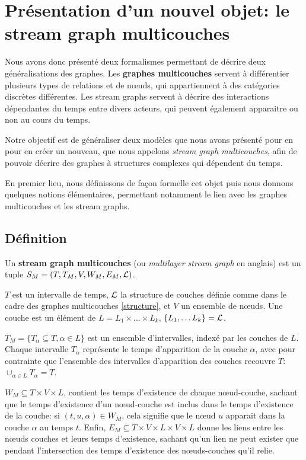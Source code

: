 \documentclass[11pt,a4paper]{article}
\theoremstyle{definition}
\theoremstyle{remark}
\theoremstyle{remark}
\def \stgm {stream graph multicouches}
\def \stgs {stream graphs}
\begin{document}
 
\section{Présentation d'un nouvel objet: le \stgm{}}

    Nous avons donc présenté deux formalismes permettant de décrire deux généralisations des graphes. Les \textbf{graphes multicouches} servent à différentier plusieurs types de relations et de n\oe{}uds, qui appartiennent à des catégories discrètes différentes. Les \stgs{} servent à décrire des interactions dépendantes du temps entre divers acteurs, qui peuvent également apparaitre ou non au cours du temps.
    
    
    Notre objectif est de généraliser deux modèles que nous avons présenté pour en pour en créer un nouveau, que nous appelons \textit{\stgm{}}, afin de pouvoir décrire des graphes à structures complexes qui dépendent du temps.
    
    
    En premier lieu, nous définissons de façon formelle cet objet puis nous donnons quelques notions élémentaires, permettant notamment le lien avec les graphes multicouches et les \stgs{}.


\subsection{Définition}

    Un \textbf{\stgm{}}  (ou \textit{multilayer stream graph} en anglais) est un tuple $S_M = (T,T_M,V,W_M,E_M,{\cal L})$.
    
    $T$ est un intervalle de temps, ${\cal L}$ la structure de couches définie comme dans le cadre des graphes multicouches \cref{structure}, et $V$ un ensemble de n\oe{}uds. Une couche est un élément de $L=L_1\times \dots \times L_k$, $\{L_1,\dots L_k\}={\cal L} $.
    
    $T_M=\{T_{\alpha}\subseteq T, \alpha \in L \}$ est un ensemble d'intervalles, indexé par les couches de $L$. Chaque intervalle $T_{\alpha}$ représente le temps d'apparition de la couche $\alpha$, avec pour contrainte que l'ensemble des intervalles d'apparition des couches recouvre $T$: $\cup_{\alpha \in L} T_{\alpha} = T$. 
    
    $W_M \subseteq T \times V \times L$, contient les temps d'existence de chaque nœud-couche, sachant que le temps d'existence d'un nœud-couche est inclus dans le temps d'existence de la couche: si $(t,u,\alpha) \in W_M$, cela signifie que le n\oe{}ud $u$ apparait dans la couche $\alpha$ au temps $t$. Enfin, $E_M \subseteq T \times V \times L \times V \times L$ donne les liens entre les nœuds couches et leurs temps d'existence, sachant qu'un lien ne peut exister que pendant l'intersection des temps d'existence des nœuds-couches qu'il relie.
    
\end{document}
